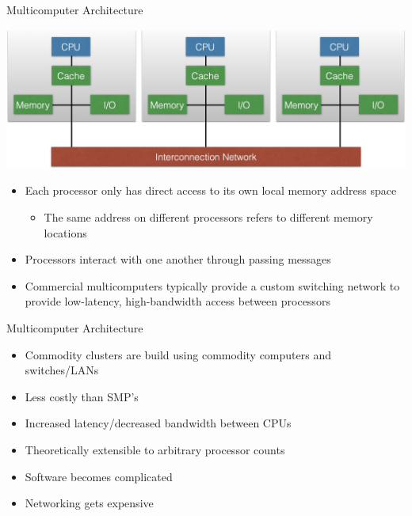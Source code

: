 \begin{frame}{Multicomputer Architecture}
\begin{center}
\includegraphics[scale=0.25]{figures/cluster_interconnect.jpg}
\end{center}
\begin{itemize}
\item Each processor only has direct access to its own local memory address space
\begin{itemize}
\item The same address on different processors refers to different memory locations
\end{itemize}
\item Processors interact with one another through passing messages
\item Commercial multicomputers typically provide a custom switching network to
      provide low-latency, high-bandwidth access between processors
\end{itemize}
\end{frame}

\begin{frame}{Multicomputer Architecture}
\begin{itemize}
\item Commodity clusters are build using commodity computers and switches/LANs
\item Less costly than SMP's
\item Increased latency/decreased bandwidth between CPUs
\item Theoretically extensible to arbitrary processor counts
\item Software becomes complicated
\item Networking gets expensive
\end{itemize}
\end{frame}

